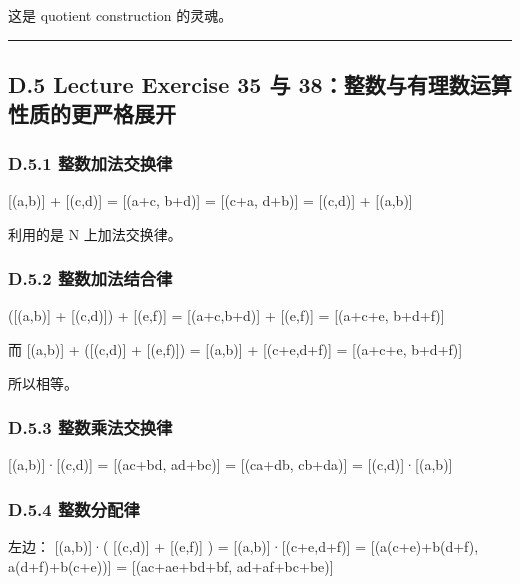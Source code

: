 \documentclass[
  11pt,
]{article}
\begin{document}
这是 quotient construction 的灵魂。

\begin{center}\rule{0.5\linewidth}{0.5pt}\end{center}

\subsection{D.5 Lecture Exercise 35 与
38：整数与有理数运算性质的更严格展开}\label{d.5-lecture-exercise-35-ux4e0e-38ux6574ux6570ux4e0eux6709ux7406ux6570ux8fd0ux7b97ux6027ux8d28ux7684ux66f4ux4e25ux683cux5c55ux5f00}

\subsubsection{D.5.1
整数加法交换律}\label{d.5.1-ux6574ux6570ux52a0ux6cd5ux4ea4ux6362ux5f8b}

{[}(a,b){]} + {[}(c,d){]} = {[}(a+c, b+d){]} = {[}(c+a, d+b){]} =
{[}(c,d){]} + {[}(a,b){]}

利用的是 N 上加法交换律。

\subsubsection{D.5.2
整数加法结合律}\label{d.5.2-ux6574ux6570ux52a0ux6cd5ux7ed3ux5408ux5f8b}

({[}(a,b){]} + {[}(c,d){]}) + {[}(e,f){]} = {[}(a+c,b+d){]} +
{[}(e,f){]} = {[}(a+c+e, b+d+f){]}

而 {[}(a,b){]} + ({[}(c,d){]} + {[}(e,f){]}) = {[}(a,b){]} +
{[}(c+e,d+f){]} = {[}(a+c+e, b+d+f){]}

所以相等。

\subsubsection{D.5.3
整数乘法交换律}\label{d.5.3-ux6574ux6570ux4e58ux6cd5ux4ea4ux6362ux5f8b}

{[}(a,b){]}·{[}(c,d){]} = {[}(ac+bd, ad+bc){]} = {[}(ca+db, cb+da){]} =
{[}(c,d){]}·{[}(a,b){]}

\subsubsection{D.5.4
整数分配律}\label{d.5.4-ux6574ux6570ux5206ux914dux5f8b}

左边： {[}(a,b){]}·( {[}(c,d){]} + {[}(e,f){]} ) =
{[}(a,b){]}·{[}(c+e,d+f){]} = {[}(a(c+e)+b(d+f), a(d+f)+b(c+e)){]} =
{[}(ac+ae+bd+bf, ad+af+bc+be){]}
\end{document}
